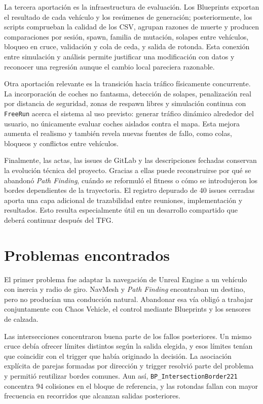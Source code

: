 La tercera aportación es la infraestructura de evaluación. Los Blueprints exportan el resultado de cada vehículo y los resúmenes de generación; posteriormente, los scripts comprueban la calidad de los CSV, agrupan razones de muerte y producen comparaciones por sesión, spawn, familia de mutación, solapes entre vehículos, bloqueo en cruce, validación y cola de ceda, y salida de rotonda. Esta conexión entre simulación y análisis permite justificar una modificación con datos y reconocer una regresión aunque el cambio local pareciera razonable.

Otra aportación relevante es la transición hacia tráfico físicamente concurrente. La incorporación de coches no fantasma, detección de solapes, penalización real por distancia de seguridad, zonas de respawn libres y simulación continua con \texttt{FreeRun} acerca el sistema al uso previsto: generar tráfico dinámico alrededor del usuario, no únicamente evaluar coches aislados contra el mapa. Esta mejora aumenta el realismo y también revela nuevas fuentes de fallo, como colas, bloqueos y conflictos entre vehículos.

Finalmente, las actas, las issues de GitLab y las descripciones fechadas conservan la evolución técnica del proyecto. Gracias a ellas puede reconstruirse por qué se abandonó \textit{Path Finding}, cuándo se reformuló el fitness o cómo se introdujeron los bordes dependientes de la trayectoria. El registro depurado de 40 issues cerradas aporta una capa adicional de trazabilidad entre reuniones, implementación y resultados. Esto resulta especialmente útil en un desarrollo compartido que deberá continuar después del TFG\@.

\section{Problemas encontrados}

El primer problema fue adaptar la navegación de Unreal Engine a un vehículo con inercia y radio de giro. NavMesh y \textit{Path Finding} encontraban un destino, pero no producían una conducción natural. Abandonar esa vía obligó a trabajar conjuntamente con Chaos Vehicle, el control mediante Blueprints y los sensores de calzada.

Las intersecciones concentraron buena parte de los fallos posteriores. Un mismo cruce debía ofrecer límites distintos según la salida elegida, y esos límites tenían que coincidir con el trigger que había originado la decisión. La asociación explícita de parejas formadas por dirección y trigger resolvió parte del problema y permitió reutilizar bordes comunes. Aun así, \texttt{BP\_IntersectionBorder221} concentra 94 colisiones en el bloque de referencia, y las rotondas fallan con mayor frecuencia en recorridos que alcanzan salidas posteriores.

